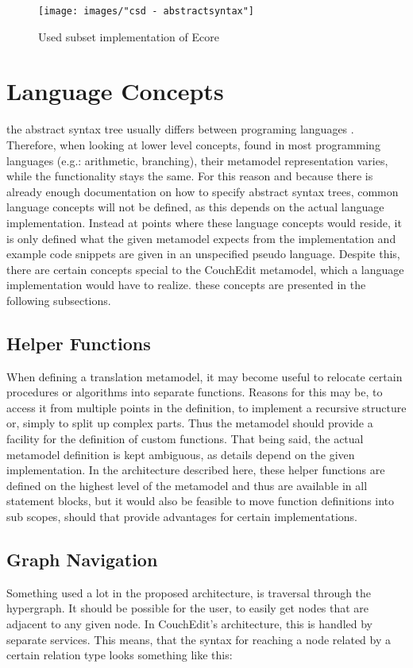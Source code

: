 \begin{figure}
\centering
\texttt{[image: images/"csd - abstractsyntax"]}
\caption{Used subset implementation of Ecore}
\label{fig:csd-abstractsyntax}
\end{figure}


\section{Language Concepts}
the abstract syntax tree usually differs between programing languages . Therefore, when looking at lower level concepts, found in most programming languages (e.g.: arithmetic, branching), their metamodel representation varies, while the functionality stays the same. For this reason and because there is already enough documentation on how to specify abstract syntax trees, common language concepts will not be defined, as this depends on the actual language implementation. Instead at points where these language concepts would reside, it is only defined what the given metamodel expects from the implementation and example code snippets are given in an unspecified pseudo language. Despite this, there are certain concepts special to the CouchEdit metamodel, which a language implementation would have to realize. these concepts are presented in the following subsections.


\subsection{Helper Functions}
When defining a translation metamodel, it may become useful to relocate certain procedures or algorithms into separate functions. Reasons for this may be, to access it from multiple points in the definition, to implement a recursive structure or, simply to split up complex parts. Thus the metamodel should provide a facility for the definition of custom functions. That being said, the actual metamodel definition is kept ambiguous, as details depend on the given implementation. In the architecture described here, these helper functions are defined on the highest level of the metamodel and thus are available in all statement blocks, but it would also be feasible to move function definitions into sub scopes, should that provide advantages for certain implementations. 

\subsection{Graph Navigation}
\label{sec:abstraction}
Something used a lot in the proposed architecture, is traversal through the hypergraph. It should be possible for the user, to easily get nodes that are adjacent to any given node. In CouchEdit's architecture, this is handled by separate services. This means, that the syntax for reaching a node related by a certain relation type looks something like this: 

